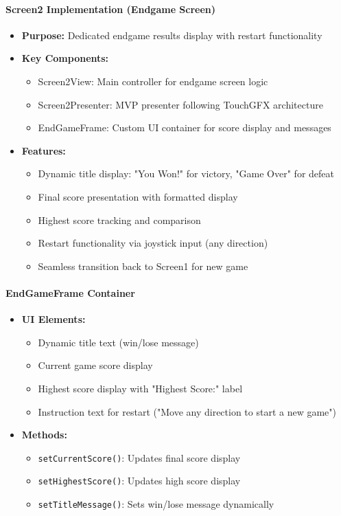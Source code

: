 \documentclass[12pt,a4paper]{article}
\begin{document}
\paragraph{Screen2 Implementation (Endgame Screen)}
\begin{itemize}[leftmargin=*]
    \item \textbf{Purpose:} Dedicated endgame results display with restart functionality
    \item \textbf{Key Components:}
    \begin{itemize}
        \item Screen2View: Main controller for endgame screen logic
        \item Screen2Presenter: MVP presenter following TouchGFX architecture
        \item EndGameFrame: Custom UI container for score display and messages
    \end{itemize}
    \item \textbf{Features:}
    \begin{itemize}
        \item Dynamic title display: "You Won!" for victory, "Game Over" for defeat
        \item Final score presentation with formatted display
        \item Highest score tracking and comparison
        \item Restart functionality via joystick input (any direction)
        \item Seamless transition back to Screen1 for new game
    \end{itemize}
\end{itemize}

\paragraph{EndGameFrame Container}
\begin{itemize}[leftmargin=*]
    \item \textbf{UI Elements:}
    \begin{itemize}
        \item Dynamic title text (win/lose message)
        \item Current game score display
        \item Highest score display with "Highest Score:" label
        \item Instruction text for restart ("Move any direction to start a new game")
    \end{itemize}
    \item \textbf{Methods:}
    \begin{itemize}
        \item \texttt{setCurrentScore()}: Updates final score display
        \item \texttt{setHighestScore()}: Updates high score display
        \item \texttt{setTitleMessage()}: Sets win/lose message dynamically
    \end{itemize}
\end{itemize}
\end{document}
